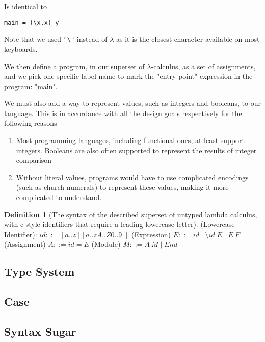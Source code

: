 \documentclass[
author={Kiran Sturt},
degree={BSc},
title={Implementing a Step by Step Evaluator for a Simple Functional Programming language},
unit={COMS30045},]{dissertation}
\theoremstyle{definition}
\theoremstyle{break}
\newtheorem{syntax}{Definition}
\theoremstyle{definition}
\begin{document}
Is identical to

\begin{lstlisting}[]
main = (\x.x) y
\end{lstlisting}

Note that we used \verb|"\"| instead of \(\lambda\) as it is the closest character available on most keyboards.

We then define a program, in our superset of \(\lambda\)-calculus, as a set of assignments, and we pick one specific label name to mark the "entry-point" expression in the program: "main". 

We must also add a way to represent values, such as integers and booleans, to our language. This is in accordance with all the design goals respectively for the following reasons
\begin{enumerate}
    \item Most programming languages, including functional ones, at least support integers. Booleans are also often supported to represent the results of integer comparison
    \item Without literal values, programs would have to use complicated encodings (such as church numerals) to represent these values, making it more complicated to understand.
\end{enumerate}

\begin{syntax}[The syntax of the described superset of untyped lambda calculus, with c-style identifiers that require a leading lowercase letter]
(Lowercase Identifier): \(id ::= [a..z][a..zA..Z0..9\_]\)
\newline
(Expression) \(E ::= id \mid \setminus id. E \mid E\:F\)
\newline
(Assignment) \(A ::= id = E\)
\newline
(Module) \(M ::= A\: M \mid End\)
\end{syntax}

\subsection{Type System}


\subsection{Case}

\subsection{Syntax Sugar}
\end{document}
